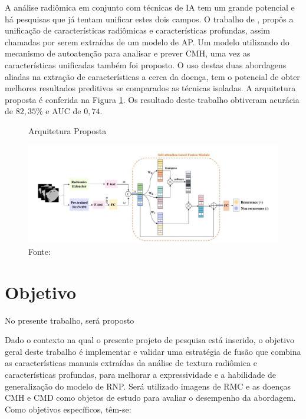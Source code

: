 A análise radiômica em conjunto com técnicas de \gls{IA} tem um grande potencial e há pesquisas que já tentam unificar estes dois campos. O trabalho de , propôs a unificação de características radiômicas e características profundas, assim chamadas por serem extraídas de um modelo de \gls{AP}. Um modelo utilizando do mecanismo de autoatenção para analisar e prever \gls{CMH}, uma vez as características unificadas também foi proposto. O uso destas duas abordagens aliadas na extração de características a cerca da doença, tem o potencial de obter melhores resultados preditivos se comparados as técnicas isoladas. A arquitetura proposta é conferida na Figura \ref{fig:fig006}. Os resultado deste trabalho obtiveram acurácia de $82,35\%$ e AUC de $0,74$.

\begin{figure}[ht]
    \centering
    \captionsetup{justification=centering}
    \caption{Arquitetura Proposta}
    \includegraphics[width=1\textwidth]{figures/fig006.png}
    \caption*{Fonte: \cite{aiSelfAttentionBasedFusion2023}}
    \label{fig:fig006}
\end{figure}



\clearpage

\section{Objetivo}
\label{sec:cap1_objetivo}

No presente trabalho, será proposto 

Dado o contexto na qual o presente projeto de pesquisa está inserido, o objetivo geral deste trabalho é implementar e validar uma estratégia de fusão que combina as características manuais extraídas da análise de textura radiômica e características profundas, para melhorar a expressividade e a habilidade de generalização do modelo de \gls{RNP}. Será utilizado imagens de \gls{RMC} e as doenças \gls{CMH} e \gls{CMD} como objetos de estudo para avaliar o desempenho da abordagem. Como objetivos específicos, têm-se:

